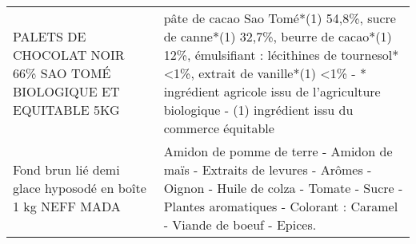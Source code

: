 \begin{longtable}{p{5cm}p{10cm}}
                                        PALETS DE CHOCOLAT NOIR 66\% SAO TOMÉ  BIOLOGIQUE ET EQUITABLE 5KG &                                                                                                                                                                                                                                                                                                                                                                                                                                                                                                                                                                                                                                                                                                                                                                       pâte de cacao Sao Tomé*(1) 54,8\%, sucre de canne*(1) 32,7\%, beurre de cacao*(1) 12\%, émulsifiant : lécithines de tournesol* <1\%, extrait de vanille*(1) <1\%  - * ingrédient agricole issu de l'agriculture biologique  - (1) ingrédient issu du commerce équitable \\
                                                Fond brun lié demi glace hyposodé en boîte 1 kg NEFF MADA &                                                                                                                                                                                                                                                                                                                                                                                                                                                                                                                                                                                                                                                                                                                                                                                                                                               Amidon de pomme de terre - Amidon de maïs - Extraits de levures - Arômes - Oignon - Huile de colza - Tomate - Sucre - Plantes aromatiques - Colorant : Caramel - Viande de boeuf - Epices. \\

\end{longtable}
